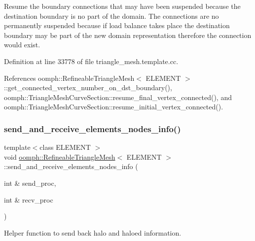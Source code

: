 Resume the boundary connections that may have been suspended because the destination boundary is no part of the domain. The connections are no permanently suspended because if load balance takes place the destination boundary may be part of the new domain representation therefore the connection would exist. 



Definition at line 33778 of file triangle\+\_\+mesh.\+template.\+cc.



References oomph\+::\+Refineable\+Triangle\+Mesh$<$ E\+L\+E\+M\+E\+N\+T $>$\+::get\+\_\+connected\+\_\+vertex\+\_\+number\+\_\+on\+\_\+dst\+\_\+boundary(), oomph\+::\+Triangle\+Mesh\+Curve\+Section\+::resume\+\_\+final\+\_\+vertex\+\_\+connected(), and oomph\+::\+Triangle\+Mesh\+Curve\+Section\+::resume\+\_\+initial\+\_\+vertex\+\_\+connected().

\mbox{\label{classoomph_1_1RefineableTriangleMesh_a2c0b3b2f5bf635ea8b3cba6554cc96b3}} 
\subsubsection{\texorpdfstring{send\+\_\+and\+\_\+receive\+\_\+elements\+\_\+nodes\+\_\+info()}{send\_and\_receive\_elements\_nodes\_info()}}
{\footnotesize\ttfamily template$<$class E\+L\+E\+M\+E\+NT $>$ \\
void \hyperlink{classoomph_1_1RefineableTriangleMesh}{oomph\+::\+Refineable\+Triangle\+Mesh}$<$ E\+L\+E\+M\+E\+NT $>$\+::send\+\_\+and\+\_\+receive\+\_\+elements\+\_\+nodes\+\_\+info (\begin{DoxyParamCaption}\item[{int \&}]{send\+\_\+proc,  }\item[{int \&}]{recv\+\_\+proc }\end{DoxyParamCaption})\hspace{0.3cm}{\ttfamily [protected]}}



Helper function to send back halo and haloed information. 

